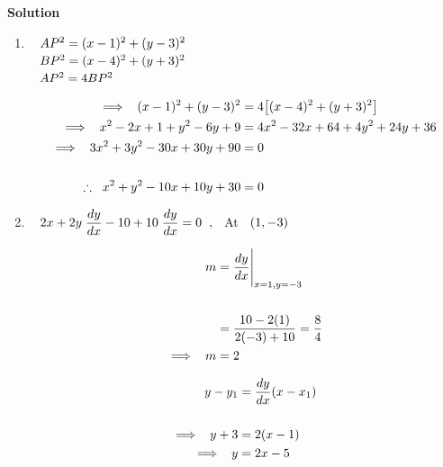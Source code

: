 \documentclass[11pt,a4paper]{article}
\begin{document}
\textbf{Solution}
\begin{enumerate}
\item[a.] $\hspace{0.3cm} AP^2 = (x - 1)^2 + (y - 3)^2$\\

$\hspace{0.3cm} BP^2 = (x- 4)^2 + (y + 3)^2$\\

$\hspace{0.3cm} AP^2 = 4BP^2$

\begin{align*}
\implies\hspace{0.2cm} (x - 1)^2 + (y - 3)^2 & = 4\big[ (x - 4)^2 + (y + 3)^2\big]\\
\implies \hspace{0.2cm} x^2 - 2x + 1 + y^2 - 6y + 9 & = 4x^2 - 32x + 64 + 4y^2 + 24y + 36\\
\implies \hspace{0.2cm} 3x^2 + 3y^2 - 30x + 30y + 90 & = 0\\\\
\therefore \hspace{0.2cm}  x^2 + y^2 - 10x + 10y + 30 & = 0\\
\end{align*}



\item[b.] $\hspace{0.3cm}\displaystyle{2x + 2y\hspace{0.1cm}\dfrac{dy}{dx} - 10 + 10\hspace{0.1cm}\dfrac{dy}{dx} = 0\hspace{0.2cm},\hspace{0.2cm}}$ At $\hspace{0.2cm}(1,-3)$

\begin{align*}
m & = \dfrac{dy}{dx}\Bigg|_{x = 1, y = -3}\\\\
 & = \dfrac{10 - 2(1)}{2(-3) + 10}
 = \dfrac{8}{4}\\
\implies \hspace{0.2cm} m & = 2
\end{align*}


\begin{align*}
y - y_1 & = \dfrac{dy}{dx}(x - x_1)\\\\
\implies \hspace{0.2cm} y + 3 & = 2(x- 1)\\
\implies \hspace{0.2cm} y &  = 2x - 5
\end{align*}




\end{enumerate}
\end{document}
